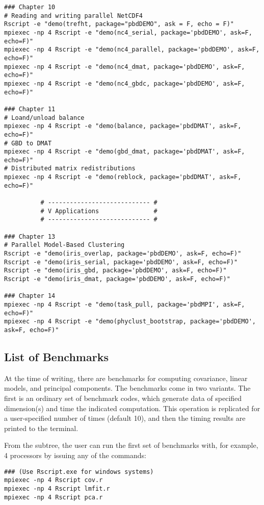 \begin{lstlisting}[title=List of Demos]
### Chapter 10
# Reading and writing parallel NetCDF4
Rscript -e "demo(trefht, package="pbdDEMO", ask = F, echo = F)"
mpiexec -np 4 Rscript -e "demo(nc4_serial, package='pbdDEMO', ask=F, echo=F)"
mpiexec -np 4 Rscript -e "demo(nc4_parallel, package='pbdDEMO', ask=F, echo=F)"
mpiexec -np 4 Rscript -e "demo(nc4_dmat, package='pbdDEMO', ask=F, echo=F)"
mpiexec -np 4 Rscript -e "demo(nc4_gbdc, package='pbdDEMO', ask=F, echo=F)"

### Chapter 11
# Loand/unload balance
mpiexec -np 4 Rscript -e "demo(balance, package='pbdDMAT', ask=F, echo=F)"
# GBD to DMAT
mpiexec -np 4 Rscript -e "demo(gbd_dmat, package='pbdDMAT', ask=F, echo=F)"
# Distributed matrix redistributions
mpiexec -np 4 Rscript -e "demo(reblock, package='pbdDMAT', ask=F, echo=F)"

		  # ---------------------------- #
		  # V Applications               #
		  # ---------------------------- #

### Chapter 13
# Parallel Model-Based Clustering
Rscript -e "demo(iris_overlap, package='pbdDEMO', ask=F, echo=F)"
Rscript -e "demo(iris_serial, package='pbdDEMO', ask=F, echo=F)"
Rscript -e "demo(iris_gbd, package='pbdDEMO', ask=F, echo=F)"
Rscript -e "demo(iris_dmat, package='pbdDEMO', ask=F, echo=F)"

### Chapter 14
mpiexec -np 4 Rscript -e "demo(task_pull, package='pbdMPI', ask=F, echo=F)"
mpiexec -np 4 Rscript -e "demo(phyclust_bootstrap, package='pbdDEMO', ask=F, echo=F)"

\end{lstlisting}





\subsection{List of Benchmarks}

At the time of writing, there are benchmarks for computing covariance, linear
models, and principal components. The benchmarks come in two variants. The
first is an ordinary set of benchmark codes, which generate data of specified
dimension(s) and time the indicated computation. This operation is replicated
for a user-specified number of times (default 10), and then the timing results
are printed to the terminal.  

From the  subtree, the user can run the first set of
benchmarks with, for example, 4 processors by issuing any of the commands:
\begin{lstlisting}
### (Use Rscript.exe for windows systems)
mpiexec -np 4 Rscript cov.r
mpiexec -np 4 Rscript lmfit.r
mpiexec -np 4 Rscript pca.r
\end{lstlisting}

